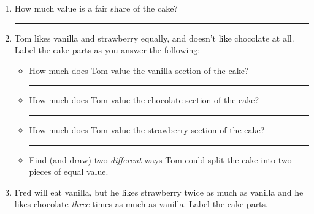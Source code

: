 \documentclass[12pt]{article}
\newcommand{\ans}[1][1in]{\rule{#1}{.5pt}}
\begin{document}
\begin{enumerate}
\item How much value is a fair share of the cake? \ans

\item Tom likes vanilla and strawberry equally, and doesn't like chocolate at all. Label the cake parts as you answer the following:


\begin{minipage}{.6\textwidth}
    \begin{itemize}
    \item How much does Tom value the vanilla section of the cake? \ans
    \item How much does Tom value the chocolate section of the cake? \ans
    \item How much does Tom value the strawberry section of the cake? \ans
    \item Find (and draw) two \emph{different} ways Tom could split the cake into two pieces of equal value.
    \end{itemize}
    \end{minipage}
\begin{minipage}{.3\textwidth}
\hfill
{}
\hfill
\hfill {}
\end{minipage}
\vfill

\item Fred will eat vanilla, but he likes strawberry twice as much as vanilla and he likes chocolate \emph{three} times as much as vanilla. Label the cake parts.


\end{enumerate}
\end{document}
